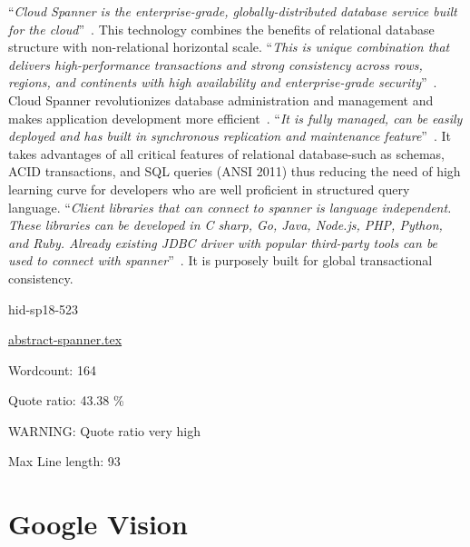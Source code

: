 \color{blue}``\emph{Cloud Spanner is the enterprise-grade, globally-distributed database 
service built for the cloud}''\color{black}~\cite{hid-sp18-523-www-google-spanner}. 
This technology combines the benefits of relational database structure 
with non-relational horizontal scale. \color{blue}``\emph{This is unique combination that 
delivers high-performance transactions and strong consistency across rows, 
regions, and continents with high availability and enterprise-grade 
security}''\color{black}~\cite{hid-sp18-523-www-google-spanner}. Cloud Spanner 
revolutionizes database administration and management and makes 
application development more efficient~\cite{hid-sp18-523-www-google-spanner}.
\color{blue}``\emph{It is fully managed, can be easily deployed and has built in synchronous 
replication and maintenance feature}''\color{black}~\cite{hid-sp18-523-www-google-spanner}. 
It takes advantages of all critical features of relational database-such 
as schemas, ACID transactions, and SQL queries (ANSI 2011) thus reducing 
the need of high learning curve for developers who are well proficient in 
structured query language. 
\color{blue}``\emph{Client libraries that can connect to spanner is language independent. 
These libraries can be developed in C sharp, Go, Java, Node.js, PHP, Python, 
and Ruby. Already existing JDBC driver with popular third-party tools can be 
used to connect with spanner}''\color{black}~\cite{hid-sp18-523-www-google-spanner}. It is 
purposely built for global transactional consistency.


\begin{IU}

hid-sp18-523

\href{https://github.com/cloudmesh-community/hid-sp18-523/blob/master//technology/abstract-spanner.tex}{abstract-spanner.tex}

 

Wordcount: 164


Quote ratio: 43.38 \%

WARNING: Quote ratio very high
 
Max Line length: 93
\end{IU}

\section{Google Vision}


